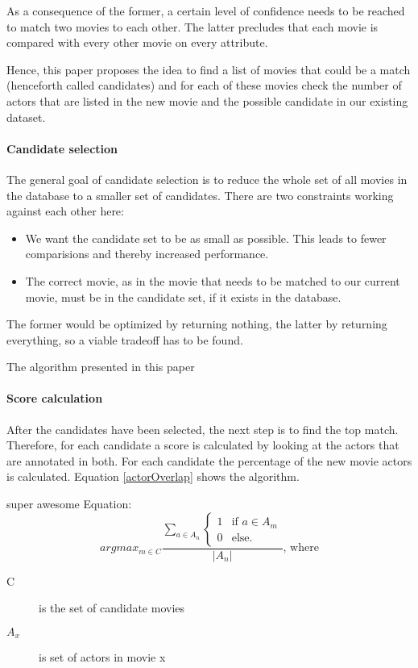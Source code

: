 As a consequence of the former, a certain level of confidence needs to be reached to match two movies to each other. The latter precludes that each movie is compared with every other movie on every attribute.

Hence, this paper proposes the idea to find a list of movies that could be a match (henceforth called candidates) and for each of these movies check the number of actors that are listed in the new movie and the possible candidate in our existing dataset.

\paragraph{Candidate selection}

The general goal of candidate selection is to reduce the whole set of all movies in the database to a smaller set of candidates.
There are two constraints working against each other here:
\begin{itemize}
	\item We want the candidate set to be as small as possible. This leads to fewer comparisions and thereby increased performance.
	\item The correct movie, as in the movie that needs to be matched to our current movie, must be in the candidate set, if it exists in the database.
\end{itemize}
The former would be optimized by returning nothing, the latter by returning everything, so a viable tradeoff has to be found.

The algorithm presented in this paper 

\paragraph{Score calculation}
After the candidates have been selected, the next step is to find the top match. Therefore, for each candidate a score is calculated by looking at the actors that are annotated in both. For each candidate the percentage of the new movie actors is calculated. Equation \ref{actorOverlap} shows the algorithm.

super awesome Equation:
\begin{equation} \label{actorOverlap}
arg max_{m \in C} \frac
{\sum_{a \in A_{n}} \begin{cases} 1 &\text{if $a\in A_{m}$}\\ 0 &\text{else.} \end{cases} }
{\left\lvert  A_{n} \right\rvert} \text{, where}
\end{equation}
\begin{description}
\item[C] is the set of candidate movies
\item[$A_{x}$] is set of actors in movie x
\end{description}


